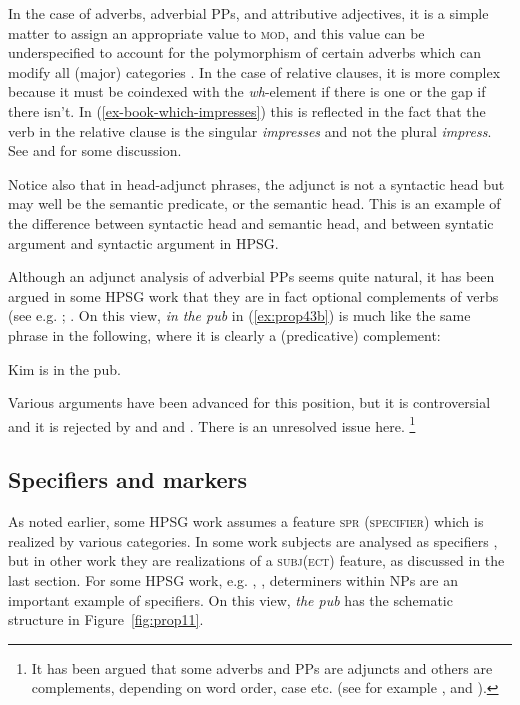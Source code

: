 \documentclass[output=paper
	        ,collection
	        ,collectionchapter
 	        ,biblatex
                ,babelshorthands
                ,newtxmath
                ,draftmode
                ,colorlinks, citecolor=brown
]{langscibook}
\begin{document}
In the case of adverbs, adverbial PPs, and attributive adjectives, it is a simple matter to assign an appropriate value to \textsc{mod}, and this value can be underspecified to account for the polymorphism of certain adverbs which can modify all (major) categories \citep{AG2003b-u}. In the case of relative clauses, it is more complex because it must be coindexed with the \emph{wh}-element if there is one or the gap if there isn’t. In (\ref{ex-book-which-impresses}) this is reflected in the fact that the verb in the relative clause is the singular \emph{impresses} and not the plural \emph{impress}. See  and  for some discussion.

Notice also that in head-adjunct phrases, the adjunct is not a syntactic head but may well be the semantic predicate, or the semantic head. This is an example of the difference between syntactic head and semantic head, and between syntatic argument and syntactic argument in HPSG.

Although an adjunct analysis of adverbial PPs seems quite natural, it has been argued in some HPSG work that they are in fact optional complements of verbs (see e.g. \citealp[4]{AG97a-u,BMS2001a}; \citealp[168, fn.2]{GSag2000a-u}. On this view, \emph{in the pub} in (\ref{ex:prop43b}) is much like the same phrase in the following, where it is clearly a (predicative) complement:

\ea\label{ex:prop44}
Kim is in the pub. 
\z

Various arguments have been advanced for this position, but it is controversial and it is rejected by \citet{Levine2003a} and \citet[Chapter~3]{LH2006a} and \citet{Chaves2009a}. There is an unresolved issue here.%
%
\footnote{It has been argued that some adverbs and PPs are adjuncts and others are complements, depending on word order, case etc. (see for example \citealp{Prze99}, \citealp{HA2014a-u} and ).}
%

\subsection{Specifiers and markers}\label{sec:prop6.2}

As noted earlier, some HPSG work assumes a feature \textsc{spr (specifier)} which is realized by various categories. In some work subjects are analysed as specifiers \citep*[100--103]{SWB2003a}, but in other work they are realizations of a \textsc{subj(ect)} feature, as discussed in the last section. For some HPSG work, e.g. , , determiners within NPs are an important example of specifiers. On this view, \emph{the pub} has the schematic structure in Figure~\ref{fig:prop11}.
\end{document}
